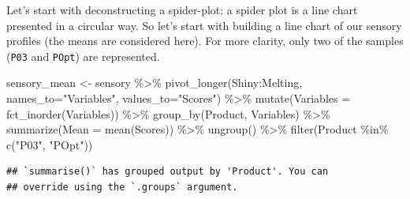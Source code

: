 \documentclass[
]{krantz}
\makeatletter
\newenvironment{Shaded}{\begin{snugshade}}{\end{snugshade}}
\newcommand{\AttributeTok}[1]{\textcolor[rgb]{0.61,0.61,0.61}{#1}}
\newcommand{\FunctionTok}[1]{\textcolor[rgb]{0,0,0}{#1}}
\newcommand{\NormalTok}[1]{#1}
\newcommand{\OtherTok}[1]{\textcolor[rgb]{0.37,0.37,0.37}{#1}}
\newcommand{\SpecialCharTok}[1]{\textcolor[rgb]{0,0,0}{#1}}
\newcommand{\StringTok}[1]{\textcolor[rgb]{0.5,0.5,0.5}{#1}}
\newenvironment{kframe}{%
\medskip{}
\setlength{\fboxsep}{.8em}
 \def\at@end@of@kframe{}%
 \ifinner\ifhmode%
  \def\at@end@of@kframe{\end{minipage}}%
  \begin{minipage}{\columnwidth}%
 \fi\fi%
 \def\FrameCommand##1{\hskip\@totalleftmargin \hskip-\fboxsep
 \colorbox{shadecolor}{##1}\hskip-\fboxsep
     \hskip-\linewidth \hskip-\@totalleftmargin \hskip\columnwidth}%
 \MakeFramed {\advance\hsize-\width
   \@totalleftmargin\z@ \linewidth\hsize
   \@setminipage}}%
 {\par\unskip\endMakeFramed%
 \at@end@of@kframe}
\renewenvironment{Shaded}{\begin{kframe}}{\end{kframe}}
\makeatother
\begin{document}
Let's start with deconstructing a spider-plot: a spider plot is a line chart presented in a circular way. So let's start with building a line chart of our sensory profiles (the means are considered here). For more clarity, only two of the samples (\texttt{P03} and \texttt{POpt}) are represented.

\begin{Shaded}
\begin{Highlighting}[]
\NormalTok{sensory\_mean }\OtherTok{\textless{}{-}}\NormalTok{ sensory }\SpecialCharTok{\%\textgreater{}\%} 
  \FunctionTok{pivot\_longer}\NormalTok{(Shiny}\SpecialCharTok{:}\NormalTok{Melting, }
               \AttributeTok{names\_to=}\StringTok{"Variables"}\NormalTok{, }\AttributeTok{values\_to=}\StringTok{"Scores"}\NormalTok{) }\SpecialCharTok{\%\textgreater{}\%} 
  \FunctionTok{mutate}\NormalTok{(}\AttributeTok{Variables =} \FunctionTok{fct\_inorder}\NormalTok{(Variables)) }\SpecialCharTok{\%\textgreater{}\%} 
  \FunctionTok{group\_by}\NormalTok{(Product, Variables) }\SpecialCharTok{\%\textgreater{}\%} 
  \FunctionTok{summarize}\NormalTok{(}\AttributeTok{Mean =} \FunctionTok{mean}\NormalTok{(Scores)) }\SpecialCharTok{\%\textgreater{}\%} 
  \FunctionTok{ungroup}\NormalTok{() }\SpecialCharTok{\%\textgreater{}\%} 
  \FunctionTok{filter}\NormalTok{(Product }\SpecialCharTok{\%in\%} \FunctionTok{c}\NormalTok{(}\StringTok{"P03"}\NormalTok{, }\StringTok{"POpt"}\NormalTok{))}
\end{Highlighting}
\end{Shaded}

\begin{verbatim}
## `summarise()` has grouped output by 'Product'. You can
## override using the `.groups` argument.
\end{verbatim}
\end{document}
